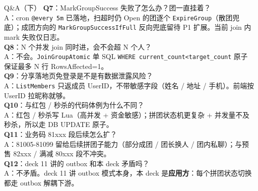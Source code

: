 \documentclass[aspectratio=169,11pt]{beamer}
\begin{document}
\begin{frame}[shrink]{Q\&A（下）}
\small
\textbf{Q7}：MarkGroupSuccess 失败了怎么办？团一直挂着？\\
\hspace{4mm}\small A：cron \texttt{@every 5m} 已落地，扫超时仍 Open 的团逐个 \texttt{ExpireGroup}（散团兜底）；成团方向的 \texttt{MarkGroupSuccessIfFull} 反向兜底留待 P1 扩展。当前 join 内 mark 失败仅日志。\\

\vspace{1mm}
\textbf{Q8}：N 个并发 join 同时进，会不会超 N 个人？\\
\hspace{4mm}\small A：不会。\texttt{JoinGroupAtomic} 单 SQL \texttt{WHERE current\_count<target\_count} 原子保证最多 N 行 RowsAffected=1。\\

\vspace{1mm}
\textbf{Q9}：分享落地页免登录是不是有数据泄露风险？\\
\hspace{4mm}\small A：\texttt{ListMembers} 只返成员 UserID，不带敏感字段（姓名 / 地址 / 手机）。前端按 UserID 拉昵称就够。\\

\vspace{1mm}
\textbf{Q10}：与红包 / 秒杀的代码体例为什么不同？\\
\hspace{4mm}\small A：红包 / 秒杀写 Lua（高并发 + 资金敏感）；拼团状态机更复杂 + 并发量不及秒杀，所以走 DB UPDATE 原子。\\

\vspace{1mm}
\textbf{Q11}：业务码 81xxx 段后续怎么扩？\\
\hspace{4mm}\small A：81005-81099 留给后续拼团子能力（部分成团 / 团长换人 / 团内私聊）；与预售 82xxx / 满减 80xxx 段不冲突。\\

\vspace{1mm}
\textbf{Q12}：deck 11 讲的 outbox 和本 deck 矛盾吗？\\
\hspace{4mm}\small A：不矛盾。deck 11 讲 outbox 模式本身，本 deck 是\textbf{应用方}：每个拼团状态切换都走 outbox 解耦下游。\\
\end{frame}
\end{document}
